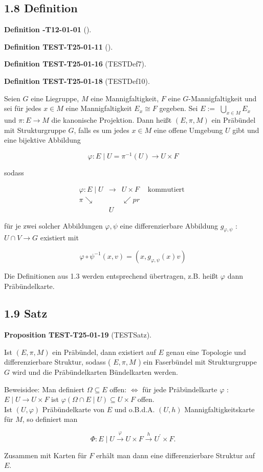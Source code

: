 \documentclass[10pt, letterpaper]{article}
\newcommand{\CustomHeading}[3]{%
  \par\medskip\noindent%
  \textbf{#1 #2} \textnormal{(#3)}.\enskip%
}
\newenvironment{DEF}[2]{\begin{unitbox}\CustomHeading{Definition}{#1}{#2}}{\end{unitbox}}
\newenvironment{PROP}[2]{\begin{unitbox}\CustomHeading{Proposition}{#1}{#2}}{\end{unitbox}}
\begin{document}
\subsection*{1.8 Definition}
\begin{DEF}{-T12-01-01}{}
\begin{DEF}{TEST-T25-01-11}{}
\begin{DEF}{TEST-T25-01-16}{TESTDef7}
\begin{DEF}{TEST-T25-01-18}{TESTDef10}
Seien $G$ eine Liegruppe, $M$ eine Mannigfaltigkeit, $F$ eine $G$-Mannigfaltigkeit und sei für jedes $x \in M$ eine Mannigfaltigkeit $E_{x} \cong F$ gegeben. Sei $E:=$ $\bigcup_{x \in M} E_{x}$ und $\pi: E \rightarrow M$ die kanonische Projektion. Dann heißt $(E, \pi, M)$ ein Präbündel mit Strukturgruppe $G$, falls es um jedes $x \in M$ eine offene Umgebung $U$ gibt und eine bijektive Abbildung

$$
\varphi: E \mid U=\pi^{-1}(U) \rightarrow U \times F
$$

sodass

$$
\begin{array}{rlll}
\varphi: E \mid U & \longrightarrow & U \times F & \text { kommutiert } \\
\pi \searrow & & \swarrow p r & \\
& U & &
\end{array}
$$

für je zwei solcher Abbildungen $\varphi, \psi$ eine differenzierbare Abbildung $g_{\varphi, \psi}$ : $U \cap V \rightarrow G$ existiert mit

$$
\varphi \circ \psi^{-1}(x, v)=\left(x, g_{\varphi, \psi}(x) v\right)
$$

Die Definitionen aus 1.3 werden entsprechend übertragen, z.B. heißt $\varphi$ dann Präbündelkarte.
\end{DEF}
\end{DEF}
\end{DEF}
\end{DEF}

\subsection*{1.9 Satz}
\begin{PROP}{TEST-T25-01-19}{TESTSatz}
Ist $(E, \pi, M)$ ein Präbündel, dann existiert auf $E$ genau eine Topologie und differenzierbare Struktur, sodass ( $E, \pi, M$ ) ein Faserbündel mit Strukturgruppe $G$ wird und die Präbündelkarten Bündelkarten werden.

Beweisidee: Man definiert $\Omega \subseteq E$ offen: $\Leftrightarrow$ für jede Präbündelkarte $\varphi$ : $E \mid U \rightarrow U \times F$ ist $\varphi(\Omega \cap E \mid U) \subseteq U \times F$ offen.\\
Ist $(U, \varphi)$ Präbündelkarte von $E$ und o.B.d.A. $(U, h)$ Mannigfaltigkeitskarte für $M$, so definiert man

$$
\Phi: E \mid U \xrightarrow{\varphi} U \times F \xrightarrow{h} U^{\prime} \times F .
$$

Zusammen mit Karten für $F$ erhält man dann eine differenzierbare Struktur auf $E$.
\end{PROP}
\end{document}
